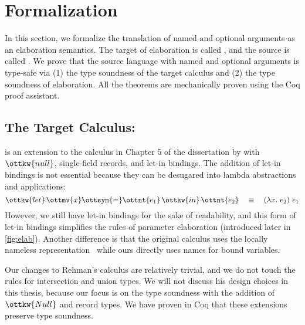 \section{Formalization} \label{sec:iu-uaena}

In this section, we formalize the translation of named and optional arguments as
an elaboration semantics. The target of elaboration is called \lambdaiu, and the
source is called \uaena. We prove that the source language with named and
optional arguments is type-safe via (1) the type soundness of the target
calculus and (2) the type soundness of elaboration. All the theorems are
mechanically proven using the Coq proof assistant.

\subsection{The Target Calculus: \lambdaiu} \label{sec:lambdaiu}

\lambdaiu is an extension to the calculus in Chapter 5 of the dissertation by
\citet{rehman2023blend} with $\ottkw{null}$, single-field records, and let-in
bindings. The addition of let-in bindings is not essential because they can be
desugared into lambda abstractions and applications:
\begin{equation*}
  \ottkw{let} \, \ottmv{x}  \ottsym{=}  \ottnt{e_{{\mathrm{1}}}} \, \ottkw{in} \, \ottnt{e_{{\mathrm{2}}}} \quad \equiv \quad (\lambda x.\ e_2)\ e_1
\end{equation*}
However, we still have let-in bindings for the sake of readability, and this
form of let-in bindings simplifies the rules of parameter elaboration
(introduced later in \autoref{fig:elab}). Another difference is that the
original calculus uses the locally nameless
representation~\citep{chargueraud2012locally} while ours directly uses names for
bound variables.

Our changes to Rehman's calculus are relatively trivial, and we do not touch the
rules for intersection and union types. We will not discuss his design choices
in this thesis, because our focus is on the type soundness with the addition of
$\ottkw{Null}$ and record types. We have proven in Coq that these extensions
preserve type soundness.

